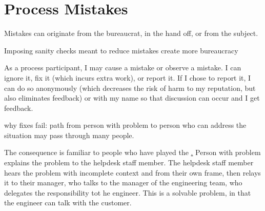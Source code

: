\section{Process Mistakes}

Mistakes can originate from the bureaucrat, in the hand off, or from the subject.

Imposing sanity checks meant to reduce mistakes create more bureaucracy 


As a process participant, I may cause a mistake or observe a mistake. I can ignore it, fix it (which incurs extra work), or report it. If I chose to report it, I can do so anonymously (which decreases the risk of harm to my reputation, but also eliminates feedback) or with my name so that discussion can occur and I get feedback.
    
    
    

why fixes fail: path from person with problem to person who can address the situation may pass through many people. 

The consequence is familiar to people who have played the \href{game of telephone}.
Person with problem explains the problem to the helpdesk staff member. The helpdesk staff member hears the problem with incomplete context and from their own frame, then relays it to their manager, who talks to the manager of the engineering team, who delegates the responsibility tot he engineer. 
This is a solvable problem, in that the engineer can talk with the customer. 

